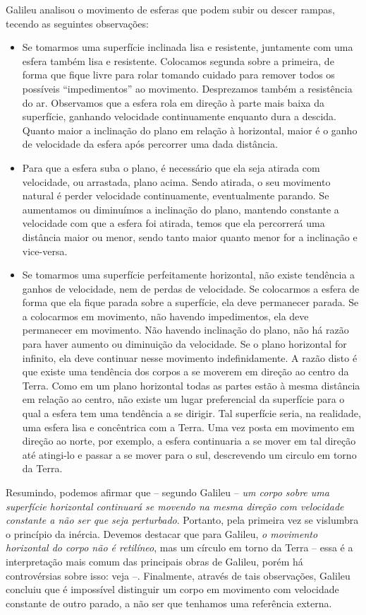 Galileu analisou o movimento de esferas que podem subir ou descer rampas, tecendo as seguintes observações:
\begin{itemize}
  \item Se tomarmos uma superfície inclinada lisa e resistente, juntamente com uma esfera também lisa e resistente. Colocamos segunda sobre a primeira, de forma que fique livre para rolar tomando cuidado para remover todos os possíveis ``impedimentos'' ao movimento. Desprezamos também a resistência do ar. Observamos que a esfera rola em direção à parte mais baixa da superfície, ganhando velocidade continuamente enquanto dura a descida. Quanto maior a inclinação do plano em relação à horizontal, maior é o ganho de velocidade da esfera após percorrer uma dada distância.
  \item Para que a esfera suba o plano, é necessário que ela seja atirada com velocidade, ou arrastada, plano acima. Sendo atirada, o seu movimento natural é perder velocidade continuamente, eventualmente parando. Se aumentamos ou diminuímos a inclinação do plano, mantendo constante a velocidade com que a esfera foi atirada, temos que ela percorrerá uma distância maior ou menor, sendo tanto maior quanto menor for a inclinação e vice-versa.
  \item Se tomarmos uma superfície perfeitamente horizontal, não existe tendência a ganhos de velocidade, nem de perdas de velocidade. Se colocarmos a esfera de forma que ela fique parada sobre a superfície, ela deve permanecer parada. Se a colocarmos em movimento, não havendo impedimentos, ela deve permanecer em movimento. Não havendo inclinação do plano, não há razão para haver aumento ou diminuição da velocidade. Se o plano horizontal for infinito, ela deve continuar nesse movimento indefinidamente. A razão disto é que existe uma tendência dos corpos a se moverem em direção ao centro da Terra. Como em um plano horizontal todas as partes estão à mesma distância em relação ao centro, não existe um lugar preferencial da superfície para o qual a esfera tem uma tendência a se dirigir. Tal superfície seria, na realidade, uma esfera lisa e concêntrica com a Terra. Uma vez posta em movimento em direção ao norte, por exemplo, a esfera continuaria a se mover em tal direção até atingi-lo e passar a se mover para o sul, descrevendo um circulo em torno da Terra.
\end{itemize}
%
Resumindo, podemos afirmar que -- segundo Galileu -- \emph{um corpo sobre uma superfície horizontal continuará se movendo na mesma direção com velocidade constante a não ser que seja perturbado}. Portanto, pela primeira vez se vislumbra o princípio da inércia. Devemos destacar que para Galileu, \emph{o movimento horizontal do corpo não é retilíneo}, mas um círculo em torno da Terra -- essa é a interpretação mais comum das principais obras de Galileu, porém há controvérsias sobre isso: veja \cite{Vasconcelos2005} --. Finalmente, através de tais observações, Galileu concluiu que é impossível distinguir um corpo em movimento com velocidade constante de outro parado, a não ser que tenhamos uma referência externa.

